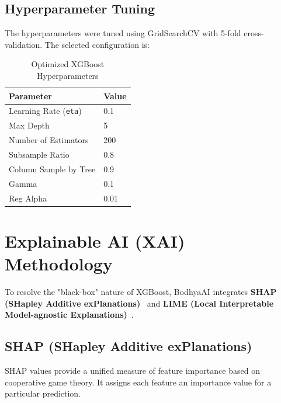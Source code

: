 \documentclass[12pt,a4paper]{report}
\begin{document}
\subsection{Hyperparameter Tuning}
The hyperparameters were tuned using GridSearchCV with 5-fold cross-validation. The selected configuration is:
\begin{table}[H]
\centering
\caption{Optimized XGBoost Hyperparameters}
\label{tab:xgb_params}
\begin{tabular}{|l|l|}
\hline
\textbf{Parameter} & \textbf{Value} \\
\hline
Learning Rate (\texttt{eta}) & 0.1 \\
Max Depth & 5 \\
Number of Estimators & 200 \\
Subsample Ratio & 0.8 \\
Column Sample by Tree & 0.9 \\
Gamma & 0.1 \\
Reg Alpha & 0.01 \\
\hline
\end{tabular}
\end{table}

\section{Explainable AI (XAI) Methodology}

To resolve the "black-box" nature of XGBoost, BodhyaAI integrates \textbf{SHAP (SHapley Additive exPlanations)}~\cite{lundberg2017shap} and \textbf{LIME (Local Interpretable Model-agnostic Explanations)}~\cite{ribeiro2016lime}.

\subsection{SHAP (SHapley Additive exPlanations)}
SHAP values provide a unified measure of feature importance based on cooperative game theory. It assigns each feature an importance value for a particular prediction.
\end{document}
